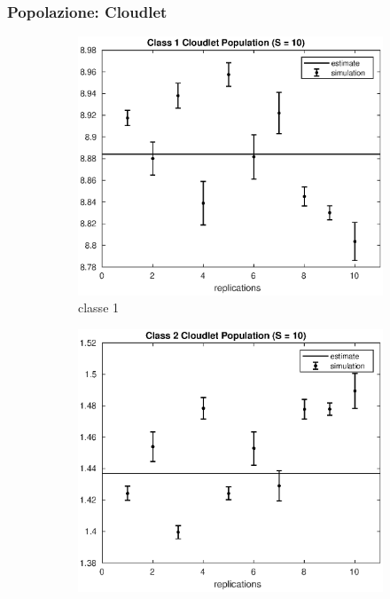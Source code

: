 \subsubsection{Popolazione: Cloudlet}
%
\begin{figure}[!h]
\centering
%
\begin{subfigure}[t]{0.49\textwidth}
\includegraphics[width=\textwidth]{figures/simul/10_500K_n1clet}
\caption{classe 1}
\label{10_n1clet}
\end{subfigure}
%
\begin{subfigure}[t]{0.49\textwidth}
\includegraphics[width=\textwidth]{figures/simul/10_500K_n2clet}

\end{subfigure}
\end{figure}
